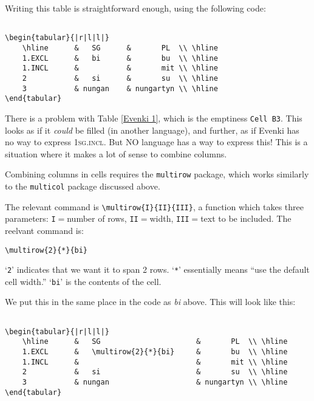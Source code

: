 \documentclass[11pt]{article}
\newcommand{\strt}{\noindent{$\bullet$} }
\begin{document}
\strt Writing this table is straightforward enough, using the following code:

\begin{lstlisting}[breaklines]

\begin{tabular}{|r|l|l|}
    \hline      &   SG      &       PL  \\ \hline
    1.EXCL      &   bi      &       bu  \\ \hline
    1.INCL      &           &       mit \\ \hline
    2           &   si      &       su  \\ \hline 
    3           & nungan    & nungartyn \\ \hline
\end{tabular}

\end{lstlisting}

\strt There is a problem with Table \ref{Evenki 1}, which is the emptiness \texttt{Cell B3}.  This looks as if it \textit{could} be filled (in another language), and further, as if Evenki has no way to express \textsc{1sg.incl}.  But NO language has a way to express this!  This is a situation where it makes a lot of sense to combine columns.

\strt Combining columns in cells requires the \texttt{multirow} package, which works similarly to the \texttt{multicol} package discussed above.

\strt The relevant command is  \texttt{\textbackslash multirow\{I\}\{II\}\{III\}}, a function which takes three parameters: \texttt{I}$=$number of rows, \texttt{II}$=$width, \texttt{III}$=$text to be included.  The reelvant command is:

\medskip

\noindent \texttt{\textbackslash multirow\{2\}\{*\}\{bi\}}

\medskip

\strt `\texttt{2}' indicates that we want it to span 2 rows.  `\texttt{*}' essentially means ``use the default cell width.''  `\texttt{bi}' is the contents of the cell.

\strt We put this in the same place in the code as \textit{bi} above.  This will look like this:


\begin{lstlisting}[breaklines]

\begin{tabular}{|r|l|l|}
    \hline      &   SG                      &       PL  \\ \hline
    1.EXCL      &   \multirow{2}{*}{bi}     &       bu  \\ \hline
    1.INCL      &                           &       mit \\ \hline
    2           &   si                      &       su  \\ \hline 
    3           & nungan                    & nungartyn \\ \hline
\end{tabular}

\end{lstlisting}
\end{document}
